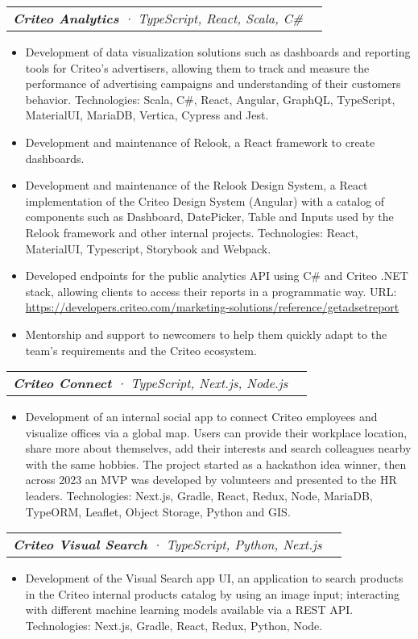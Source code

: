 \documentclass[letterpaper,11pt]{article}
\makeatletter
\newcommand{\resumeItem}[1]{
  \item\small{
    {#1 \vspace{-2pt}}
  }
}
\newcommand{\resumeSubSubheading}[2]{
    \vspace{-2pt}\item
    \begin{tabular*}{0.97\textwidth}{l@{\extracolsep{\fill}}r}
      \textit{\small#1} & \textit{\small #2} \\
    \end{tabular*}\vspace{-7pt}
}
\newcommand{\resumeItemListStart}{\begin{itemize}}
\newcommand{\resumeItemListEnd}{\end{itemize}\vspace{-5pt}}
\makeatother
\begin{document}
    \resumeSubSubheading{\textbf{Criteo Analytics} · TypeScript, React, Scala, C\# }{}
      \resumeItemListStart
        \resumeItem{Development of data visualization solutions such as dashboards and reporting tools for Criteo's advertisers, allowing them to track and measure the performance of advertising campaigns and understanding of their customers behavior. Technologies: Scala, C\#, React, Angular, GraphQL, TypeScript, MaterialUI, MariaDB, Vertica, Cypress and Jest.}
        \resumeItem{Development and maintenance of Relook, a React framework to create dashboards.}
        \resumeItem{Development and maintenance of the Relook Design System, a React implementation of the Criteo Design System (Angular) with a catalog of components such as Dashboard, DatePicker, Table and Inputs used by the Relook framework and other internal projects. Technologies: React, MaterialUI, Typescript, Storybook and Webpack.}
        \resumeItem{Developed endpoints for the public analytics API using C\# and Criteo .NET stack, allowing clients to access their reports in a programmatic way. URL: {\href{https://developers.criteo.com/marketing-solutions/reference/getadsetreport}{\color{blue}https://developers.criteo.com/marketing-solutions/reference/getadsetreport}}
        }
        \resumeItem{Mentorship and support to newcomers to help them quickly adapt to the team's requirements and the Criteo ecosystem.}
        \resumeItemListEnd
    
    \resumeSubSubheading{\textbf{Criteo Connect} · TypeScript, Next.js, Node.js }{}
      \resumeItemListStart
        \resumeItem{Development of an internal social app to connect Criteo employees and visualize offices via a global map. Users can provide their workplace location, share more about themselves, add their interests and search colleagues nearby with the same hobbies. The project started as a hackathon idea winner, then across 2023 an MVP was developed by volunteers and presented to the HR leaders. Technologies: Next.js, Gradle, React, Redux, Node, MariaDB, TypeORM, Leaflet, Object Storage, Python and GIS.}
        \resumeItemListEnd
      
      \resumeSubSubheading{\textbf{Criteo Visual Search} · TypeScript, Python, Next.js }{}
        \resumeItemListStart
          \resumeItem{Development of the Visual Search app UI, an application to search products in the Criteo internal products catalog by using an image input; interacting with different machine learning models available via a REST API.
          Technologies: Next.js, Gradle, React, Redux, Python, Node.}
          \resumeItemListEnd
\end{document}
